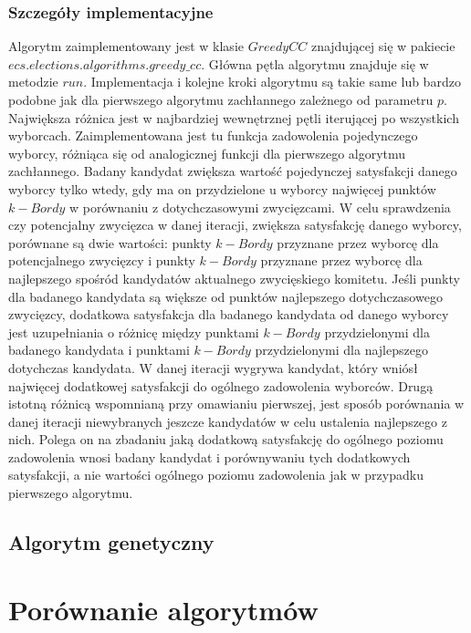 \documentclass[pdflatex,11pt]{../aghdoc_version2}
\begin{document}
\subsection{Szczegóły implementacyjne}
Algorytm zaimplementowany jest w klasie $GreedyCC$ znajdującej się w pakiecie
$ecs.elections.algorithms.greedy\_cc$. Główna pętla algorytmu znajduje się w metodzie $run$.
Implementacja i kolejne kroki algorytmu są takie same lub bardzo podobne jak dla
pierwszego algorytmu zachłannego zależnego od parametru $p$. Największa różnica jest w najbardziej wewnętrznej pętli
iterującej po wszystkich wyborcach. Zaimplementowana jest tu funkcja zadowolenia
pojedynczego wyborcy, różniąca się od analogicznej funkcji dla pierwszego algorytmu
zachłannego. Badany kandydat zwiększa wartość pojedynczej satysfakcji danego wyborcy
tylko wtedy, gdy ma on przydzielone u wyborcy najwięcej punktów $k-Bordy$ w porównaniu z
dotychczasowymi zwycięzcami. W celu sprawdzenia czy potencjalny zwycięzca w danej
iteracji, zwiększa satysfakcję danego wyborcy, porównane są dwie wartości: punkty $k-Bordy$
przyznane przez wyborcę dla potencjalnego zwycięzcy i punkty $k-Bordy$ przyznane przez
wyborcę dla najlepszego spośród kandydatów aktualnego zwycięskiego komitetu. Jeśli
punkty dla badanego kandydata są większe od punktów najlepszego dotychczasowego
zwycięzcy, dodatkowa satysfakcja dla badanego kandydata od danego wyborcy jest
uzupełniania o różnicę między punktami $k-Bordy$ przydzielonymi dla badanego kandydata i
punktami $k-Bordy$ przydzielonymi dla najlepszego dotychczas kandydata. W danej iteracji
wygrywa kandydat, który wniósł najwięcej dodatkowej satysfakcji do ogólnego zadowolenia
wyborców. Drugą istotną różnicą wspomnianą przy omawianiu pierwszej, jest sposób
porównania w danej iteracji niewybranych jeszcze kandydatów w celu ustalenia najlepszego
z nich. Polega on na zbadaniu jaką dodatkową satysfakcję do ogólnego poziomu
zadowolenia wnosi badany kandydat i porównywaniu tych dodatkowych satysfakcji, a nie
wartości ogólnego poziomu zadowolenia jak w przypadku pierwszego algorytmu.

\section{Algorytm genetyczny}

\chapter{Porównanie algorytmów}
\end{document}

